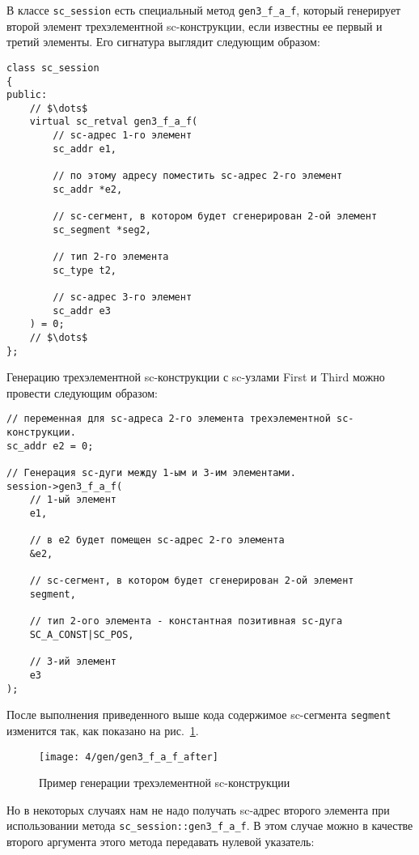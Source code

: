 В классе \lstinline{sc_session} есть специальный метод
\lstinline{gen3_f_a_f}, который генерирует второй элемент
трехэлементной sc-конструкции, если известны ее первый и третий
элементы. Его сигнатура выглядит следующим образом:
\begin{lstlisting}[texcl]
class sc_session
{
public:
    // $\dots$
    virtual sc_retval gen3_f_a_f(
        // sc-адрес 1-го элемент
        sc_addr e1,

        // по этому адресу поместить sc-адрес 2-го элемент
        sc_addr *e2,

        // sc-сегмент, в котором будет сгенерирован 2-ой элемент
        sc_segment *seg2,

        // тип 2-го элемента
        sc_type t2,

        // sc-адрес 3-го элемент
        sc_addr e3
    ) = 0;
    // $\dots$
};
\end{lstlisting}

Генерацию трехэлементной sc-конструкции с sc-узлами First и Third
можно провести следующим образом:
\begin{lstlisting}[texcl]
// переменная для sc-адреса 2-го элемента трехэлементной sc-конструкции.
sc_addr e2 = 0;

// Генерация sc-дуги между 1-ым и 3-им элементами.
session->gen3_f_a_f(
    // 1-ый элемент
    e1,

    // в e2 будет помещен sc-адрес 2-го элемента
    &e2,

    // sc-сегмент, в котором будет сгенерирован 2-ой элемент
    segment,

    // тип 2-ого элемента - константная позитивная sc-дуга
    SC_A_CONST|SC_POS,

    // 3-ий элемент
    e3
);
\end{lstlisting}

После выполнения приведенного выше кода содержимое sc-сегмента
\lstinline|segment| изменится так, как показано на
рис.~\ref{fig:gen3_f_a_f_after}.

\begin{figure}[h!]
  \centering
  \texttt{[image: 4/gen/gen3\_f\_a\_f\_after]}
  \caption{Пример генерации трехэлементной sc-конструкции}
  \label{fig:gen3_f_a_f_after}
\end{figure}

Но в некоторых случаях нам не надо получать sc-адрес второго элемента
при использовании метода \lstinline|sc_session::gen3_f_a_f|. В этом
случае можно в качестве второго аргумента этого метода передавать
нулевой указатель:


